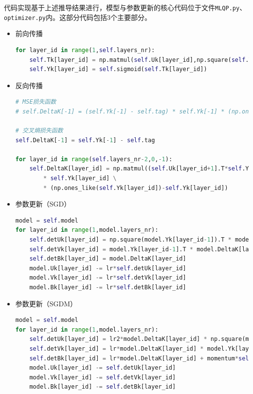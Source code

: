 \documentclass[12pt, a4paper, oneside]{ctexart}
\begin{document}
    代码实现基于上述推导结果进行，模型与参数更新的核心代码位于文件\verb|MLQP.py|、\verb|optimizer.py|内。这部分代码包括3个主要部分。
    \begin{itemize}
        \item 前向传播
    \begin{lstlisting}[language=Python]
for layer_id in range(1,self.layers_nr):
    self.Tk[layer_id] = np.matmul(self.Uk[layer_id],np.square(self.Yk[layer_id-1])) + np.matmul(self.Vk[layer_id],self.Yk[layer_id-1]) + self.Bk[layer_id]
    self.Yk[layer_id] = self.sigmoid(self.Tk[layer_id])
    \end{lstlisting}
    \item 反向传播
    \begin{lstlisting}[language=Python]
# MSE损失函数
# self.DeltaK[-1] = (self.Yk[-1] - self.tag) * self.Yk[-1] * (np.ones_like(self.Yk[-1])-self.Yk[-1])

# 交叉熵损失函数
self.DeltaK[-1] = self.Yk[-1] - self.tag

for layer_id in range(self.layers_nr-2,0,-1):
    self.DeltaK[layer_id] = np.matmul((self.Uk[layer_id+1].T*self.Yk[layer_id]*2+self.Vk[layer_id+1].T),self.DeltaK[layer_id+1]) \
        * self.Yk[layer_id] \
        * (np.ones_like(self.Yk[layer_id])-self.Yk[layer_id])
    \end{lstlisting}
    \item 参数更新（SGD）
    \begin{lstlisting}[language=Python]
model = self.model
for layer_id in range(1,model.layers_nr):
    self.detUk[layer_id] = np.square(model.Yk[layer_id-1]).T * model.DeltaK[layer_id]
    self.detVk[layer_id] = model.Yk[layer_id-1].T * model.DeltaK[layer_id]
    self.detBk[layer_id] = model.DeltaK[layer_id]
    model.Uk[layer_id] -= lr*self.detUk[layer_id]
    model.Vk[layer_id] -= lr*self.detVk[layer_id]
    model.Bk[layer_id] -= lr*self.detBk[layer_id]
    \end{lstlisting}
    \item 参数更新（SGDM）
    \begin{lstlisting}[language=Python]
model = self.model
for layer_id in range(1,model.layers_nr):
    self.detUk[layer_id] = lr2*model.DeltaK[layer_id] * np.square(model.Yk[layer_id-1].T) + momentum*self.detUk[layer_id]
    self.detVk[layer_id] = lr*model.DeltaK[layer_id] * model.Yk[layer_id-1].T + momentum*self.detVk[layer_id]
    self.detBk[layer_id] = lr*model.DeltaK[layer_id] + momentum*self.detBk[layer_id]
    model.Uk[layer_id] -= self.detUk[layer_id]
    model.Vk[layer_id] -= self.detVk[layer_id]
    model.Bk[layer_id] -= self.detBk[layer_id]
    \end{lstlisting}
    \end{itemize}
    
\end{document}
